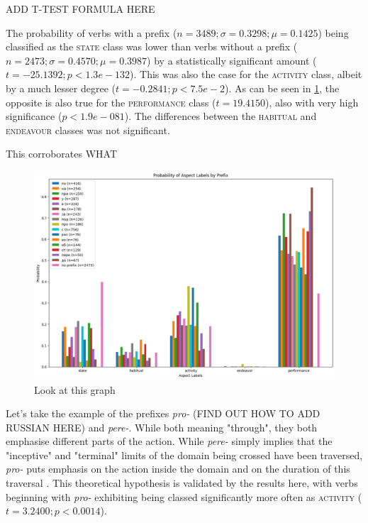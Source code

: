 ADD T-TEST FORMULA HERE

The probability of verbs with a prefix ($n=3489; \sigma = 0.3298; \mu = 0.1425$) being classified as the \textsc{state} class was lower than verbs without a prefix ($n=2473; \sigma = 0.4570; \mu = 0.3987$) by a statistically significant amount ($t = -25.1392; p < 1.3e-132$). This was also the case for the \textsc{activity} class, albeit by a much lesser degree ($t=-0.2841; p < 7.5e-2$). As can be seen in \ref{fig:fine-tuned_aspect_latent_space}, the opposite is also true for the \textsc{performance} class ($t=19.4150$), also with very high significance ($p<1.9e-081$). The differences between the \textsc{habitual} and \textsc{endeavour} classes was not significant.

This corroborates WHAT

\begin{figure}
    \includegraphics[width=\textwidth]{img/aspect_prediction_by_prefix.png}
    \caption{Look at this graph}
    \label{fig:fine-tuned_aspect_latent_space}
\end{figure}

Let's take the example of the prefixes \emph{pro-} (FIND OUT HOW TO ADD RUSSIAN HERE) and \emph{pere-}. While both meaning "through", they both emphasise different parts of the action. While \emph{pere-} simply implies that the "inceptive" and "terminal" limits of the domain being crossed have been traversed, \emph{pro-} puts emphasis on the action inside the domain and on the duration of this traversal \citep{0a0c5a60-a736-3226-b927-03ba8af4fd75}. This theoretical hypothesis is validated by the results here, with verbs beginning with \emph{pro-} exhibiting being classed significantly more often as \textsc{activity} ($t=3.2400; p<0.0014$).

